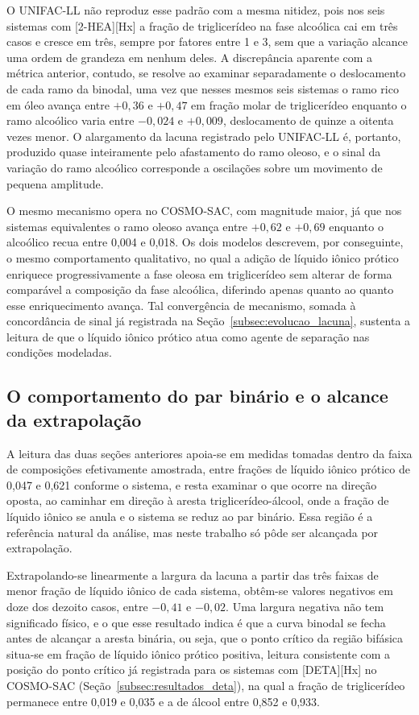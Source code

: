 O UNIFAC-LL não reproduz esse padrão com a mesma nitidez, pois nos seis sistemas com [2-HEA][Hx] a fração de triglicerídeo na fase alcoólica cai em três casos e cresce em três, sempre por fatores entre 1 e 3, sem que a variação alcance uma ordem de grandeza em nenhum deles. A discrepância aparente com a métrica anterior, contudo, se resolve ao examinar separadamente o deslocamento de cada ramo da binodal, uma vez que nesses mesmos seis sistemas o ramo rico em óleo avança entre $+0{,}36$ e $+0{,}47$ em fração molar de triglicerídeo enquanto o ramo alcoólico varia entre $-0{,}024$ e $+0{,}009$, deslocamento de quinze a oitenta vezes menor. O alargamento da lacuna registrado pelo UNIFAC-LL é, portanto, produzido quase inteiramente pelo afastamento do ramo oleoso, e o sinal da variação do ramo alcoólico corresponde a oscilações sobre um movimento de pequena amplitude.

O mesmo mecanismo opera no COSMO-SAC, com magnitude maior, já que nos sistemas equivalentes o ramo oleoso avança entre $+0{,}62$ e $+0{,}69$ enquanto o alcoólico recua entre 0,004 e 0,018. Os dois modelos descrevem, por conseguinte, o mesmo comportamento qualitativo, no qual a adição de líquido iônico prótico enriquece progressivamente a fase oleosa em triglicerídeo sem alterar de forma comparável a composição da fase alcoólica, diferindo apenas quanto ao quanto esse enriquecimento avança. Tal convergência de mecanismo, somada à concordância de sinal já registrada na Seção~\ref{subsec:evolucao_lacuna}, sustenta a leitura de que o líquido iônico prótico atua como agente de separação nas condições modeladas.

\subsection{O comportamento do par binário e o alcance da extrapolação}
\label{subsec:binario_referencia}

A leitura das duas seções anteriores apoia-se em medidas tomadas dentro da faixa de composições efetivamente amostrada, entre frações de líquido iônico prótico de 0,047 e 0,621 conforme o sistema, e resta examinar o que ocorre na direção oposta, ao caminhar em direção à aresta triglicerídeo-álcool, onde a fração de líquido iônico se anula e o sistema se reduz ao par binário. Essa região é a referência natural da análise, mas neste trabalho só pôde ser alcançada por extrapolação.

Extrapolando-se linearmente a largura da lacuna a partir das três faixas de menor fração de líquido iônico de cada sistema, obtêm-se valores negativos em doze dos dezoito casos, entre $-0{,}41$ e $-0{,}02$. Uma largura negativa não tem significado físico, e o que esse resultado indica é que a curva binodal se fecha antes de alcançar a aresta binária, ou seja, que o ponto crítico da região bifásica situa-se em fração de líquido iônico prótico positiva, leitura consistente com a posição do ponto crítico já registrada para os sistemas com [DETA][Hx] no COSMO-SAC (Seção~\ref{subsec:resultados_deta}), na qual a fração de triglicerídeo permanece entre 0,019 e 0,035 e a de álcool entre 0,852 e 0,933.


